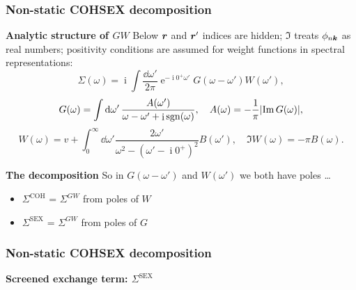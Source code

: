\documentclass[t]{beamer}
\DeclareMathOperator{\ee}{e}
\DeclareMathOperator{\ii}{i}
\DeclareMathOperator{\sgn}{sgn}
\begin{document}
\begin{frame}
\frametitle{Non-static COHSEX decomposition}

\textbf{Analytic structure of $GW$} Below $\vb*{r}$ and $\vb*{r}'$ indices are hidden;
$\Im$ treats $\phi_{n \vb*{k}}$ as real numbers;
positivity conditions are assumed for 
weight functions in spectral representations:
\begin{equation}
    \Sigma(\omega) = \ii \int \frac{\dd{\omega'}}{2\pi} 
    \ee^{- \ii 0^+ \omega'} G(\omega - \omega') W(\omega') ,
\end{equation}
\begin{equation}
    G(\omega) = \int \dd{\omega'} \frac{A(\omega')}{\omega - \omega' + \ii \sgn(\omega)}, 
    \quad A(\omega) = - \frac{1}{\pi} \abs{\Im G(\omega)},
\end{equation}
\begin{equation}
    W(\omega) = v + \int_{0}^{\infty} \dd{\omega'}
    \frac{2 \omega'}{\omega^2 - (\omega' - \ii 0^+)^2} B(\omega'), \quad 
    \Im W(\omega) = - \pi B(\omega).
\end{equation}

\textbf{The decomposition} So in $G(\omega - \omega')$ and $W(\omega')$
we both have poles \dots
\begin{itemize}
    \item $\Sigma^{\text{COH}}$ = $\Sigma^{GW}$ from poles of $W$ 
    \item $\Sigma^{\text{SEX}}$ = $\Sigma^{GW}$ from poles of $G$
\end{itemize} 

\end{frame}

\begin{frame}
\frametitle{Non-static COHSEX decomposition}

\textbf{Screened exchange term: $\Sigma^{\text{SEX}}$} 

\end{frame}
\end{document}
